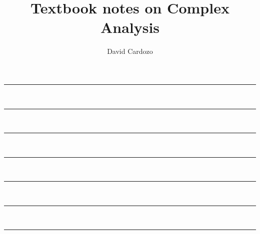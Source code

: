 \documentclass[notitlepage]{article}
\author{David Cardozo}
\title{Textbook notes on Complex Analysis}
\begin{document}





\noindent\rule{\textwidth}{1pt}\\[-0.1cm]



\noindent\rule{\textwidth}{1pt}\\[-0.1cm]



\noindent\rule{\textwidth}{1pt}\\[-0.1cm]



\noindent\rule{\textwidth}{1pt}\\[-0.1cm]



\noindent\rule{\textwidth}{1pt}\\[-0.1cm]



\noindent\rule{\textwidth}{1pt}\\[-0.1cm]



\noindent\rule{\textwidth}{1pt}\\[-0.1cm]


\end{document}
